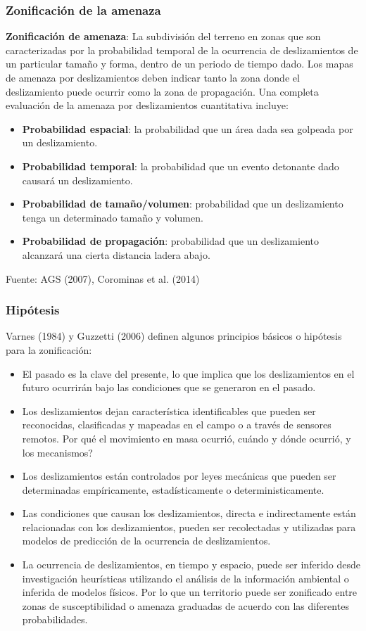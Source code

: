 \documentclass[12pt]{beamer}
\begin{document}
\begin{frame}
\frametitle{Zonificación de la amenaza}
\scriptsize{
\textbf{Zonificación de amenaza}: La subdivisión del terreno en zonas que son caracterizadas por la probabilidad temporal de la ocurrencia de deslizamientos de un particular tamaño y forma, dentro de un periodo de tiempo dado. Los mapas de amenaza por deslizamientos deben indicar tanto la zona donde el deslizamiento puede ocurrir como la zona de propagación. Una completa evaluación de la amenaza por deslizamientos cuantitativa incluye:
\vfill
\begin{itemize}
\item \textbf{Probabilidad espacial}: la probabilidad que un área dada sea golpeada por un deslizamiento.
\vfill
\item \textbf{Probabilidad temporal}: la probabilidad que un evento detonante dado causará un deslizamiento.
\vfill
\item \textbf{Probabilidad de tamaño/volumen}: probabilidad que un deslizamiento tenga un determinado tamaño y volumen.
\vfill
\item \textbf{Probabilidad de propagación}: probabilidad que un deslizamiento alcanzará una cierta distancia ladera abajo.
\end{itemize}
}
\vfill
\tiny{Fuente: AGS (2007), Corominas et al. (2014)}
\end{frame}
\begin{frame}
\frametitle{Hipótesis}
\scriptsize{
Varnes (1984) y Guzzetti (2006) definen  algunos principios básicos o hipótesis para la zonificación:
\vfill
\begin{itemize}
\item El pasado es la clave del presente, lo que implica que los deslizamientos en el futuro ocurrirán bajo las condiciones que se generaron en el pasado.
\vfill
\item Los deslizamientos dejan característica identificables que pueden ser reconocidas, clasificadas y mapeadas en el campo o a través de sensores remotos. Por qué el movimiento en masa ocurrió, cuándo y dónde ocurrió, y los mecanismos?
\vfill
\item Los deslizamientos están controlados por leyes mecánicas que pueden ser determinadas empíricamente, estadísticamente o deterministicamente. 
\vfill
\item Las condiciones que causan los deslizamientos, directa e indirectamente están relacionadas con los deslizamientos, pueden ser recolectadas y utilizadas para modelos de predicción de la ocurrencia de deslizamientos.
\vfill
\item La ocurrencia de deslizamientos, en tiempo y espacio, puede ser inferido desde investigación heurísticas utilizando el análisis de la información ambiental o inferida de modelos físicos. Por lo que un territorio puede ser zonificado entre zonas de susceptibilidad o amenaza graduadas de acuerdo con las diferentes probabilidades.
\end{itemize}
}
\end{frame}
\end{document}
